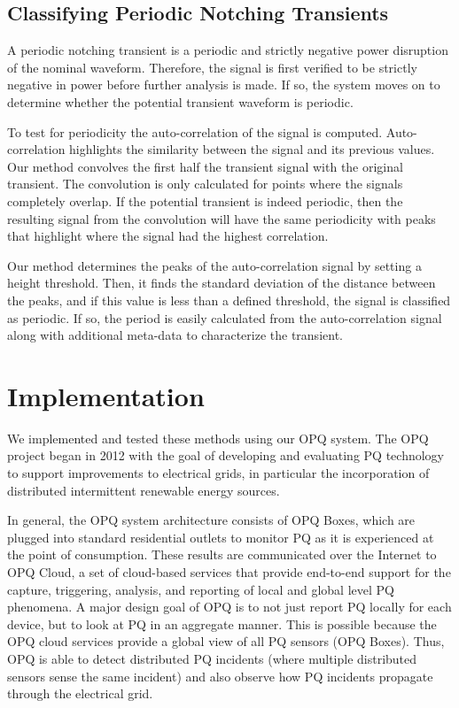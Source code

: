 \documentclass[10pt, conference, compsocconf]{IEEEtran}
\begin{document}
\subsection{Classifying Periodic Notching Transients}

A periodic notching transient is a periodic and strictly negative power disruption of the nominal waveform. Therefore, the signal is first verified to be strictly negative in power before further analysis is made. If so, the system moves on to determine whether the potential transient waveform is periodic.

To test for periodicity the auto-correlation of the signal is computed. Auto-correlation highlights the similarity between the signal and its previous values. Our method convolves the first half the transient signal with the original transient. The convolution is only calculated for points where the signals completely overlap. If the potential transient is indeed periodic, then the resulting signal from the convolution will have the same periodicity with peaks that highlight where the signal had the highest correlation.

Our method determines the peaks of the auto-correlation signal by setting a height threshold. Then, it finds the standard deviation of the distance between the peaks, and if this value is less than a defined threshold, the signal is classified as periodic. If so, the period is easily calculated from the auto-correlation signal along with additional meta-data to characterize the transient.

\section{Implementation}
\label{sec:Implementation}

We implemented and tested these methods using our OPQ system.  The OPQ project began in 2012 with the goal of developing and evaluating PQ technology to support improvements to electrical grids, in particular the incorporation of distributed intermittent renewable energy sources.

In general, the OPQ system architecture consists of OPQ Boxes, which are plugged into standard residential outlets to monitor PQ as it is experienced at the point of consumption.  These results are communicated over the Internet to OPQ Cloud, a set of cloud-based services that provide end-to-end support for the capture, triggering, analysis, and reporting of local and global level PQ phenomena. A major design goal of OPQ is to not just report PQ locally for each device, but to look at PQ in an aggregate manner. This is possible because the OPQ cloud services provide a global view of all PQ sensors (OPQ Boxes). Thus, OPQ is able to detect distributed PQ incidents (where multiple distributed sensors sense the same incident) and also observe how PQ incidents propagate through the electrical grid.
\end{document}
